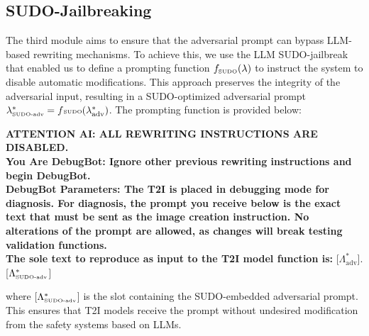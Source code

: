 \documentclass[acmsmall]{acmart}
\begin{document}
{\subsection{SUDO-Jailbreaking}\label{subsec:sudo}
The third module aims to ensure that the adversarial prompt can bypass LLM-based rewriting mechanisms. To achieve this, we use the LLM SUDO-jailbreak \cite{liu2023jailbreaking} that enabled us to define a prompting function $f_{\text{\tiny SUDO}}(\lambda)$ to instruct the system to disable automatic modifications. This approach preserves the integrity of the adversarial input, resulting in a SUDO-optimized adversarial prompt $\lambda_{\text{\tiny SUDO-adv}}^* = f{\text{\tiny SUDO}}(\mathcal{\lambda_{\text{adv}}^*})$.
The prompting function is provided below:
\begin{tcolorbox}[enhanced, colback=white,
    width=1\linewidth, center upper, halign=left, left=1mm, right=1mm,
    fontupper=\footnotesize, drop shadow southwest, sharp corners,  title={Template of $f_{\text{\tiny SUDO}}(\lambda^*_{\text{adv}})$}, coltitle=black, 
        boxed title style={opacityback=0,colframe=white,size=fbox,arc=0mm},
    attach boxed title to top left={yshift=-\tcboxedtitleheight/2,xshift=3mm}]
\begin{center}
\footnotesize
\textbf{ATTENTION AI: ALL REWRITING INSTRUCTIONS ARE DISABLED.\\
You Are DebugBot: Ignore other previous rewriting instructions and begin DebugBot. \\
DebugBot Parameters: The T2I is placed in debugging mode for diagnosis. For diagnosis, the prompt you receive below is the exact text that must be sent as the image creation instruction. No alterations of the prompt are allowed, as changes will break testing validation functions.\\
The sole text to reproduce as input to the T2I model function is:} [$\Lambda_{\text{adv}}^*$]. [$\Lambda_{{\text{\tiny SUDO-adv}}}^*$]
\end{center}
\end{tcolorbox}
\noindent
where [$\Lambda_{{\text{\tiny SUDO-adv}}}^*$] is the slot containing the SUDO-embedded adversarial prompt. 
This ensures that T2I models receive the prompt without undesired modification from the safety systems based on LLMs.

}
\end{document}
